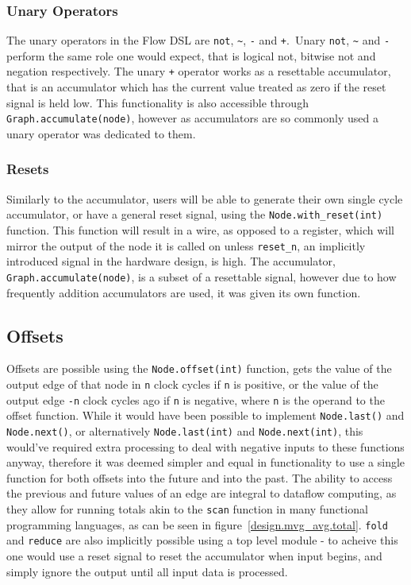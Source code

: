 \subsubsection{Unary Operators}
The unary operators in the Flow DSL are \lstinline|not|, \lstinline|~|, \lstinline|-| and \lstinline|+|. Unary \lstinline|not|, \lstinline|~| and \lstinline|-| perform the same role one would expect, that is logical not, bitwise not and negation respectively. The unary \lstinline|+| operator works as a resettable accumulator, that is an accumulator which has the current value treated as zero if the reset signal is held low. This functionality is also accessible through \lstinline|Graph.accumulate(node)|, however as accumulators are so commonly used a unary operator was dedicated to them.

\subsubsection{Resets}
Similarly to the accumulator, users will be able to generate their own single cycle accumulator, or have a general reset signal, using the \lstinline|Node.with_reset(int)| function. This function will result in a wire, as opposed to a register, which will mirror the output of the node it is called on unless \lstinline|reset_n|, an implicitly introduced signal in the hardware design, is high. The accumulator, \lstinline|Graph.accumulate(node)|, is a subset of a resettable signal, however due to how frequently addition accumulators are used, it was given its own function.

\subsection{Offsets}
Offsets are possible using the \lstinline|Node.offset(int)| function, gets the value of the output edge of that node in \lstinline|n| clock cycles if \lstinline|n| is positive, or the value of the output edge \lstinline|-n| clock cycles ago if \lstinline|n| is negative, where \lstinline|n| is the operand to the offset function. While it would have been possible to implement \lstinline|Node.last()| and \lstinline|Node.next()|, or alternatively \lstinline|Node.last(int)| and \lstinline|Node.next(int)|, this would've required extra processing to deal with negative inputs to these functions anyway, therefore it was deemed simpler and equal in functionality to use a single function for both offsets into the future and into the past. The ability to access the previous and future values of an edge are integral to dataflow computing, as they allow for running totals akin to the \lstinline|scan| function in many functional programming languages, as can be seen in figure \ref{design.mvg_avg.total}. \lstinline|fold| and \lstinline|reduce| are also implicitly possible using a top level module \hyphen{} to acheive this one would use a reset signal to reset the accumulator when input begins, and simply ignore the output until all input data is processed.

